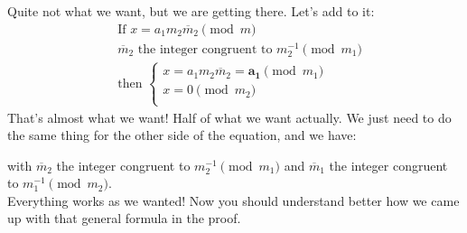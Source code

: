 \documentclass[a4paper,11pt,twocolumn]{article}
\begin{document}
Quite not what we want, but we are getting there. Let's add to it:
\begin{align*}
&\text{If } x = a_1  m_2 \overline{m}_2 \pmod{m}\\
&\overline{m}_2 \text{ the integer congruent to } m_2^{-1} \pmod{m_1}\\
&\text{then } \begin{cases}
    x = a_1 m_2 \overline{m}_2 = \boldsymbol{a_1} \pmod{m_1}\\
x = 0 \pmod{m_2}\\
\end{cases}
\end{align*}
That's almost what we want! Half of what we want actually. We just need to do the same thing for the other side of the equation, and we have:
\begin{center}\end{center}
with $\overline{m}_2$ the integer congruent to $m_2^{-1} \pmod{m_1}$ and $\overline{m}_1$ the integer congruent to $m_1^{-1} \pmod{m_2}$.\\

Everything works as we wanted! Now you should understand better how we came up with that general formula in the proof.
\end{document}
